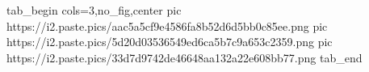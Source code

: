  
 
 
 
 


\ifcmt
  tab_begin cols=3,no_fig,center
     pic https://i2.paste.pics/aac5a5cf9e4586fa8b52d6d5bb0c85ee.png
		 pic https://i2.paste.pics/5d20d03536549ed6ca5b7c9a653c2359.png
		 pic https://i2.paste.pics/33d7d9742de46648aa132a22e608bb77.png
  tab_end
\fi
